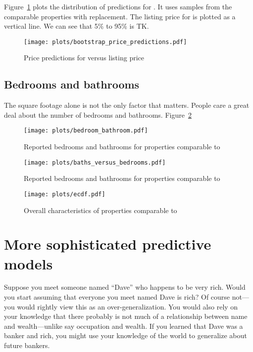 \documentclass[
10pt, %
a4paper, %
oneside, %
headinclude,footinclude, %
BCOR5mm, %
]{scrartcl}
\begin{document}
Figure~\ref{fig:bootstrap_price_predictions} plots the distribution of predictions for \PropertyName{}.
It uses samples from the comparable properties with replacement.
The listing price for \PropertyName{} is plotted as a vertical line. 
We can see that 5\% to 95\% is TK.

\begin{figure}
\centering
\caption{Price predictions for \PropertyName{} versus listing price} \label{fig:bootstrap_price_predictions}  
\texttt{[image: plots/bootstrap\_price\_predictions.pdf]} 
\end{figure}

\subsection{Bedrooms and bathrooms}
The square footage alone is not the only factor that matters.
People care a great deal about the number of bedrooms and bathrooms.
Figure~\ref{fig:bedroom_bathroom}

\begin{figure}
\centering
\caption{Reported bedrooms and bathrooms for properties comparable to \PropertyName{}} \label{fig:bedroom_bathroom}  
\texttt{[image: plots/bedroom\_bathroom.pdf]} 
\end{figure}

\begin{figure}
\centering
\caption{Reported bedrooms and bathrooms for properties comparable to \PropertyName{}} \label{fig:baths_versus_bedrooms}  
\texttt{[image: plots/baths\_versus\_bedrooms.pdf]} 
\end{figure}

\begin{figure}
\centering
\caption{Overall characteristics of properties comparable to \PropertyName{}} \label{fig:ecdf}  
\texttt{[image: plots/ecdf.pdf]} 
\end{figure}

\section{More sophisticated predictive models}

Suppose you meet someone named ``Dave'' who happens to be very rich.
Would you start assuming that everyone you meet named Dave is rich?
Of course not---you would rightly view this as an over-generalization.
You would also rely on your knowledge that there probably is not much of a relationship between name and wealth---unlike say occupation and wealth.
If you learned that Dave was a banker and rich, you might use your knowledge of the world to generalize about future bankers.
\end{document}
